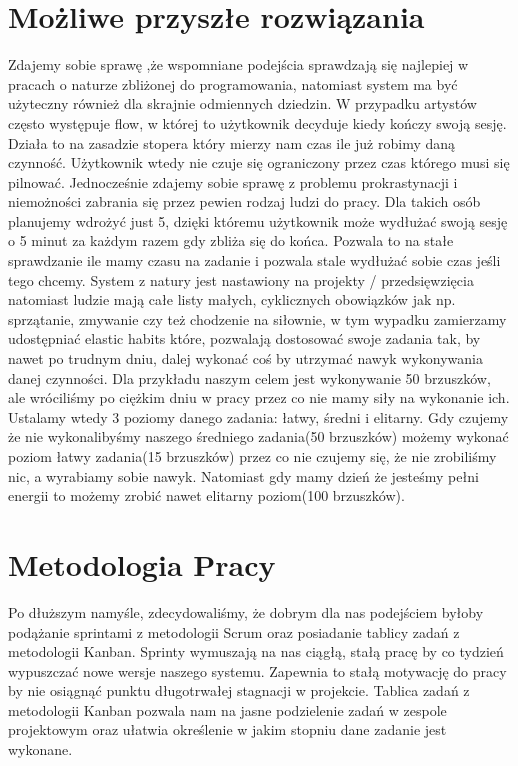 \documentclass[a4paper,11pt]{report}
\begin{document}
\section{Możliwe przyszłe rozwiązania}
Zdajemy sobie sprawę ,że wspomniane podejścia sprawdzają się najlepiej w pracach o naturze zbliżonej do programowania, natomiast system ma być użyteczny również dla skrajnie odmiennych dziedzin. W przypadku artystów często występuje flow\cite{flow}, w której to użytkownik decyduje kiedy kończy swoją sesję. Działa to na zasadzie stopera który mierzy nam czas ile już robimy daną czynność. Użytkownik wtedy nie czuje się ograniczony przez czas którego musi się pilnować.
Jednocześnie zdajemy sobie sprawę z problemu prokrastynacji i niemożności zabrania się przez pewien rodzaj ludzi do pracy. Dla takich osób planujemy wdrożyć just 5\cite{just5}, dzięki któremu użytkownik może wydłużać swoją sesję o 5 minut za każdym razem gdy zbliża się do końca. Pozwala to na stałe sprawdzanie ile mamy czasu na zadanie i pozwala stale wydłużać sobie czas jeśli tego chcemy.
System z natury jest nastawiony na projekty / przedsięwzięcia natomiast ludzie mają całe listy małych, cyklicznych obowiązków jak np. sprzątanie, zmywanie czy też chodzenie na siłownie,  w tym wypadku zamierzamy udostępniać elastic habits\cite{elastic} które, pozwalają dostosować swoje zadania tak, by nawet po trudnym dniu, dalej wykonać coś by utrzymać nawyk wykonywania danej czynności. Dla przykładu naszym celem jest wykonywanie 50 brzuszków, ale wróciliśmy po ciężkim dniu w pracy przez co nie mamy siły na wykonanie ich. Ustalamy wtedy 3 poziomy danego zadania: łatwy, średni i  elitarny. Gdy czujemy że nie wykonalibyśmy naszego średniego zadania(50 brzuszków) możemy wykonać poziom łatwy zadania(15 brzuszków) przez co nie czujemy się, że nie zrobiliśmy nic, a wyrabiamy sobie nawyk. Natomiast gdy mamy dzień że jesteśmy pełni energii to możemy zrobić nawet elitarny poziom(100 brzuszków).


\section{Metodologia Pracy}
Po dłuższym namyśle, zdecydowaliśmy, że dobrym dla nas podejściem byłoby podążanie sprintami z metodologii Scrum oraz posiadanie tablicy zadań z metodologii Kanban\cite{agile}.  Sprinty wymuszają na nas ciągłą, stałą pracę by co tydzień wypuszczać nowe wersje naszego systemu. Zapewnia to stałą motywację do pracy by nie osiągnąć punktu długotrwałej stagnacji w projekcie. Tablica zadań z metodologii Kanban pozwala nam na jasne podzielenie zadań w zespole projektowym oraz ułatwia określenie w jakim stopniu dane zadanie jest wykonane.
\end{document}
